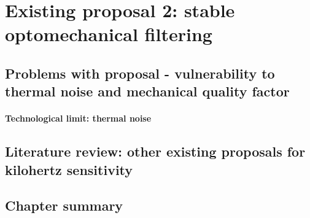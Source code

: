 \chapter{Existing proposal 2: stable optomechanical filtering}


\section{Problems with proposal - vulnerability to thermal noise and mechanical quality factor}


\subsubsection{Technological limit: thermal noise}


\section{Literature review: other existing proposals for kilohertz sensitivity}



\section{Chapter summary}

